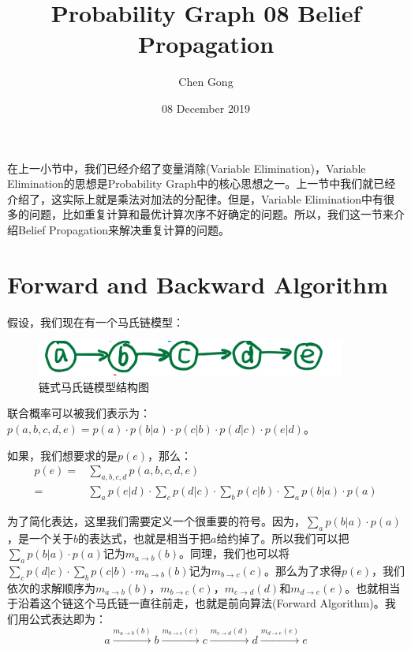 \documentclass[a4paper]{article}
\title{Probability Graph 08 Belief Propagation}
\author{Chen Gong}
\date{08 December 2019}
\begin{document}
\maketitle

在上一小节中，我们已经介绍了变量消除(Variable Elimination)，Variable Elimination的思想是Probability Graph中的核心思想之一。上一节中我们就已经介绍了，这实际上就是乘法对加法的分配律。但是，Variable Elimination中有很多的问题，比如重复计算和最优计算次序不好确定的问题。所以，我们这一节来介绍Belief Propagation来解决重复计算的问题。

\section{Forward and Backward Algorithm}
假设，我们现在有一个马氏链模型：
\begin{figure}[H]
    \centering
    \includegraphics[width=.45\textwidth]{微信图片_20191208140942.png}
    \caption{链式马氏链模型结构图}
    \label{fig:my_label_1}
\end{figure}

联合概率可以被我们表示为：$p(a,b,c,d,e)=p(a)\cdot p(b|a)\cdot p(c|b)\cdot p(d|c) \cdot p(e|d)$。

如果，我们想要求的是$p(e)$，那么：
\begin{equation}
    \begin{split}
            p(e) 
            = & \sum_{a,b,c,d}p(a,b,c,d,e) \\
            = & \sum_{a}p(e|d)\cdot\sum_cp(d|c)\cdot\sum_bp(c|b)\cdot\sum_ap(b|a)\cdot p(a)
    \end{split}
\end{equation}

为了简化表达，这里我们需要定义一个很重要的符号。因为，$\sum_ap(b|a)\cdot p(a)$，是一个关于$b$的表达式，也就是相当于把$a$给约掉了。所以我们可以把$\sum_ap(b|a)\cdot p(a)$记为$m_{a\longrightarrow b}(b)$。同理，我们也可以将$\sum_cp(d|c)\cdot\sum_bp(c|b)\cdot m_{a\longrightarrow b}(b)$记为$m_{b\longrightarrow c}(c)$。那么为了求得$p(e)$，我们依次的求解顺序为$m_{a\longrightarrow b}(b)$，$m_{b\longrightarrow c}(c)$，$m_{c\longrightarrow d}(d)$和$m_{d\longrightarrow e}(e)$。也就相当于沿着这个链这个马氏链一直往前走，也就是前向算法(Forward Algorithm)。我们用公式表达即为：
\begin{equation}
    a \stackrel{m_{a\longrightarrow b}(b)}{\longrightarrow} b \stackrel{m_{b\longrightarrow c}(c)}{\longrightarrow} c \stackrel{m_{c\longrightarrow d}(d)}{\longrightarrow} d \stackrel{m_{d\longrightarrow e}(e)}{\longrightarrow} e 
\end{equation}
\end{document}
